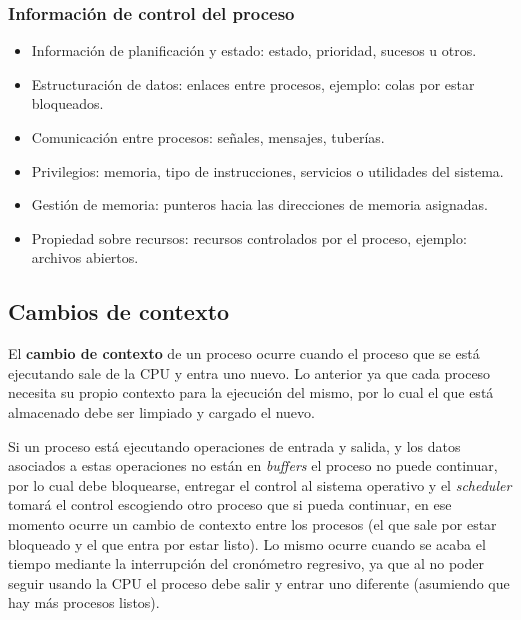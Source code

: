 \subsubsection{Información de control del proceso}
\begin{itemize}

	\item Información de planificación y estado: estado, prioridad, sucesos
	u otros.

	\item Estructuración de datos: enlaces entre procesos, ejemplo:
	colas por estar bloqueados.

	\item Comunicación entre procesos: señales, mensajes, tuberías.

	\item Privilegios: memoria, tipo de instrucciones, servicios o
	utilidades del sistema.

	\item Gestión de memoria: punteros hacia las direcciones de memoria
	asignadas.

	\item Propiedad sobre recursos: recursos controlados por el proceso,
	ejemplo: archivos abiertos.

\end{itemize}

\subsection{Cambios de contexto}
El \textbf{cambio de contexto} de un proceso ocurre cuando el proceso que se
está ejecutando sale de la CPU y entra uno nuevo. Lo anterior ya que cada
proceso necesita su propio contexto para la ejecución del mismo, por lo cual el
que está almacenado debe ser limpiado y cargado el nuevo.

Si un proceso está ejecutando operaciones de entrada y salida, y los datos
asociados a estas operaciones no están en \textit{buffers} el proceso no
puede continuar, por lo cual debe bloquearse, entregar el control al sistema
operativo y el \textit{scheduler} tomará el control escogiendo otro proceso que
si pueda continuar, en ese momento ocurre un cambio de contexto entre los
procesos (el que sale por estar bloqueado y el que entra por estar listo). Lo
mismo ocurre cuando se acaba el tiempo mediante la interrupción del cronómetro
regresivo, ya que al no poder seguir usando la CPU el proceso debe salir y
entrar uno diferente (asumiendo que hay más procesos listos).

